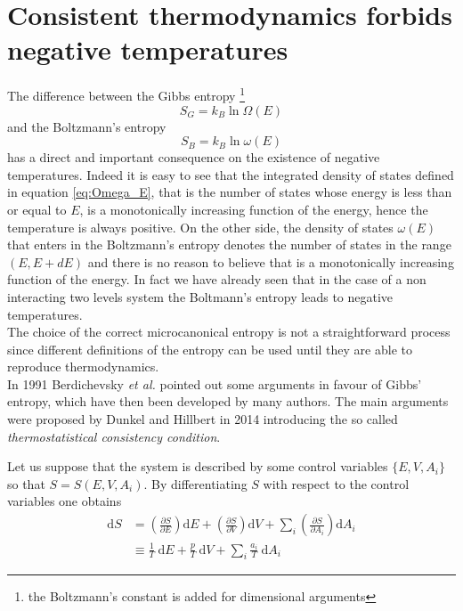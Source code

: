 \section{Consistent thermodynamics forbids negative temperatures}
The difference between the Gibbs entropy \footnote{the Boltzmann's constant is added for dimensional arguments}
\begin{equation}
    S_G = k_B \ln \Omega(E)
    \label{eq:gibbs_entropy_formula}
\end{equation}  
and the Boltzmann's entropy 
\begin{equation}
    S_B = k_B \ln \omega(E)
    \label{eq:Boltzmann_entropy_formula}
\end{equation}
has a direct and important consequence on the existence of negative temperatures. Indeed it is easy to see that the integrated density of states defined in equation 
\ref{eq:Omega_E}, that is the number of states whose energy is less than or equal to $E$, is a monotonically increasing function of the energy, hence the temperature is always positive. On the other side,
the density of states $\omega(E)$ that enters in the Boltzmann's entropy denotes the number of states in the range $(E, E+dE)$ and there is no reason to believe that is a monotonically increasing function of the energy. In fact we have already seen
that in the case of a non interacting two levels system the Boltmann's entropy leads to negative temperatures. \\
The choice of the correct microcanonical entropy is not a straightforward process since different definitions of the entropy can be used until they are able to reproduce thermodynamics. \\
In 1991 Berdichevsky \textit{et al.} \cite{original_entropy} pointed out some arguments in favour of Gibbs' entropy, which have then been developed by many authors. The main arguments were proposed by 
Dunkel and Hillbert in 2014 \cite{Dunkel_Hillbert} introducing the so called \emph{thermostatistical consistency condition}. \par 
\vspace{10pt} 
Let us suppose that the system is described by some control variables $\{E, V, A_i\}$ so that $S = S(E, V, A_i)$. By differentiating $S$ with respect to the control variables one obtains
\begin{equation*}
    \begin{aligned}
        \mathrm{d} S &=\left(\frac{\partial S}{\partial E}\right) \mathrm{d} E+\left(\frac{\partial S}{\partial V}\right) \mathrm{d} V+\sum_{i}\left(\frac{\partial S}{\partial A_{i}}\right) \mathrm{d} A_{i} \\
        & \equiv \frac{1}{T} \mathrm{~d} E+\frac{p}{T} \mathrm{~d} V+\sum_{i} \frac{a_{i}}{T} \mathrm{~d} A_{i}
        \end{aligned}
\end{equation*}
